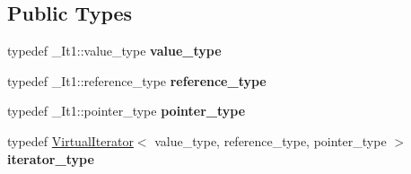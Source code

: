 \subsection*{Public Types}
\begin{DoxyCompactItemize}
\item 
typedef \+\_\+\+It1\+::value\+\_\+type {\bfseries value\+\_\+type}\hypertarget{classAudio_1_1ChainingIterator_abea0e30f8dbdbbc296a252523c571237}{}\label{classAudio_1_1ChainingIterator_abea0e30f8dbdbbc296a252523c571237}

\item 
typedef \+\_\+\+It1\+::reference\+\_\+type {\bfseries reference\+\_\+type}\hypertarget{classAudio_1_1ChainingIterator_a1b5e8dfad8ff295f213de6b8b550a499}{}\label{classAudio_1_1ChainingIterator_a1b5e8dfad8ff295f213de6b8b550a499}

\item 
typedef \+\_\+\+It1\+::pointer\+\_\+type {\bfseries pointer\+\_\+type}\hypertarget{classAudio_1_1ChainingIterator_af8c542aa6122adbd588902aabb9b1187}{}\label{classAudio_1_1ChainingIterator_af8c542aa6122adbd588902aabb9b1187}

\item 
typedef \hyperlink{classAudio_1_1VirtualIterator}{Virtual\+Iterator}$<$ value\+\_\+type, reference\+\_\+type, pointer\+\_\+type $>$ {\bfseries iterator\+\_\+type}\hypertarget{classAudio_1_1ChainingIterator_ae9525c8187f07f76d65eb98e91cd4698}{}\label{classAudio_1_1ChainingIterator_ae9525c8187f07f76d65eb98e91cd4698}

\end{DoxyCompactItemize}
